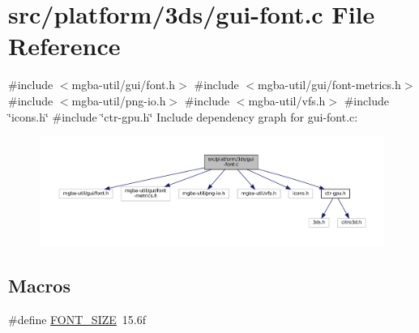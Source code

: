 \hypertarget{3ds_2gui-font_8c}{}\section{src/platform/3ds/gui-\/font.c File Reference}
\label{3ds_2gui-font_8c}
{\ttfamily \#include $<$mgba-\/util/gui/font.\+h$>$}\newline
{\ttfamily \#include $<$mgba-\/util/gui/font-\/metrics.\+h$>$}\newline
{\ttfamily \#include $<$mgba-\/util/png-\/io.\+h$>$}\newline
{\ttfamily \#include $<$mgba-\/util/vfs.\+h$>$}\newline
{\ttfamily \#include \char`\"{}icons.\+h\char`\"{}}\newline
{\ttfamily \#include \char`\"{}ctr-\/gpu.\+h\char`\"{}}\newline
Include dependency graph for gui-\/font.c\+:
\nopagebreak
\begin{figure}[H]
\begin{center}
\leavevmode
\includegraphics[width=350pt]{3ds_2gui-font_8c__incl}
\end{center}
\end{figure}
\subsection*{Macros}
\begin{DoxyCompactItemize}
\item 
\#define \mbox{\hyperlink{3ds_2gui-font_8c_aa968a61524f9ed159c4c5464cb26dd41}{F\+O\+N\+T\+\_\+\+S\+I\+ZE}}~15.\+6f
\end{DoxyCompactItemize}
